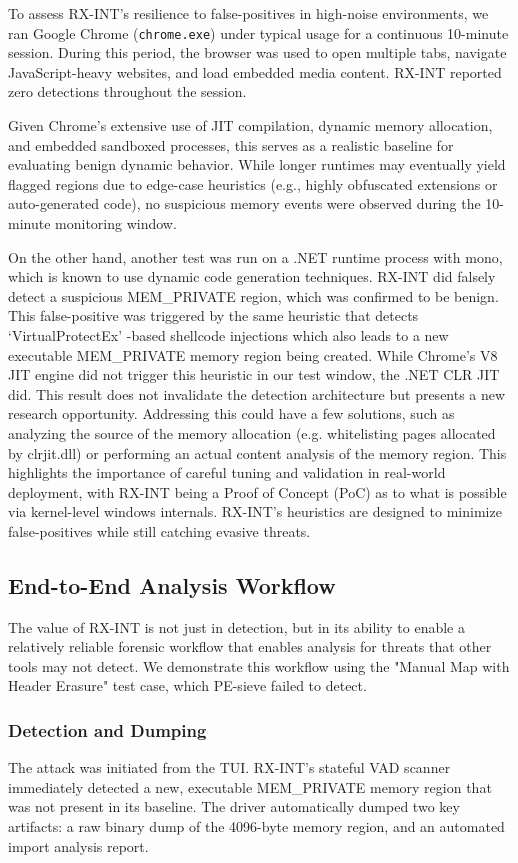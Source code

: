 \documentclass[journal]{IEEEtran}
\begin{document}
To assess RX-INT's resilience to false-positives in high-noise environments, we ran Google Chrome (\texttt{chrome.exe}) under typical usage for a continuous 10-minute session. During this period, the browser was used to open multiple tabs, navigate JavaScript-heavy websites, and load embedded media content. RX-INT reported zero detections throughout the session. 

Given Chrome's extensive use of JIT compilation, dynamic memory allocation, and embedded sandboxed processes, this serves as a realistic baseline for evaluating benign dynamic behavior. While longer runtimes may eventually yield flagged regions due to edge-case heuristics (e.g., highly obfuscated extensions or auto-generated code), no suspicious memory events were observed during the 10-minute monitoring window. 

On the other hand, another test was run on a .NET runtime process with mono, which is known to use dynamic code generation techniques. RX-INT did falsely detect a suspicious MEM\_PRIVATE region, which was confirmed to be benign. 
This false-positive was triggered by the same heuristic that detects `VirtualProtectEx' -based shellcode injections which also leads to a new executable MEM\_PRIVATE memory region being created. While Chrome's V8 JIT engine did not trigger this heuristic in our test window, the .NET CLR JIT did. This result does not invalidate the detection architecture but presents a new research opportunity. Addressing this could have a few solutions, such as analyzing the source of the memory allocation (e.g. whitelisting pages allocated by clrjit.dll) or performing an actual content analysis of the memory region. This highlights the importance of careful tuning and validation in real-world deployment, with RX-INT being a Proof of Concept (PoC) as to what is possible via kernel-level windows internals. RX-INT's heuristics are designed to minimize false-positives while still catching evasive threats.


\subsection{End-to-End Analysis Workflow}
The value of RX-INT is not just in detection, but in its ability to enable a relatively reliable forensic workflow that enables analysis for threats that other tools may not detect. We demonstrate this workflow using the "Manual Map with Header Erasure" test case, which PE-sieve failed to detect.
\subsubsection{Detection and Dumping}
The attack was initiated from the TUI. RX-INT's stateful VAD scanner immediately detected a new, executable MEM\_PRIVATE memory region that was not present in its baseline. The driver automatically dumped two key artifacts: a raw binary dump of the 4096-byte memory region, and an automated import analysis report.
\end{document}
